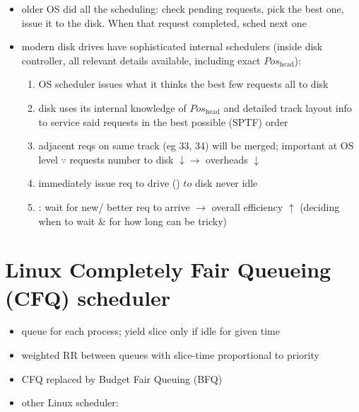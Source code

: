 \begin{itemize}
\item older OS did all the scheduling: check pending requests, pick the best one, issue it to the disk. When that request completed, sched next one
\item modern disk drives have sophisticated internal schedulers (inside disk controller, all relevant details available, including exact $Pos_{\text{head}}$):
  \begin{enumerate}[leftmargin=.2em]
  \item OS scheduler issues what it thinks the best few requests all to disk
  \item disk uses its internal knowledge of $Pos_{\text{head}}$ and detailed track layout info to service said requests in the best possible (SPTF) order
  \item {} adjacent reqs on same track (eg 33, 34) will be merged; important at OS level $\because$ requests number to disk $\downarrow \to$ overheads $\downarrow$
  \item immediately issue req to drive () $to$ disk never idle
  \item {}: wait for new/ better req to arrive $\to$ overall efficiency $\uparrow$ (deciding when to wait \& for how long can be tricky)
  \end{enumerate}
\end{itemize}
\section*{Linux Completely Fair Queueing (CFQ) scheduler}
\begin{itemize}
\item queue for each process; yield slice only if idle for given time
\item weighted RR between queues with slice-time proportional to priority
\item CFQ replaced by Budget Fair Queuing (BFQ)
\item other Linux scheduler:
\end{itemize}
